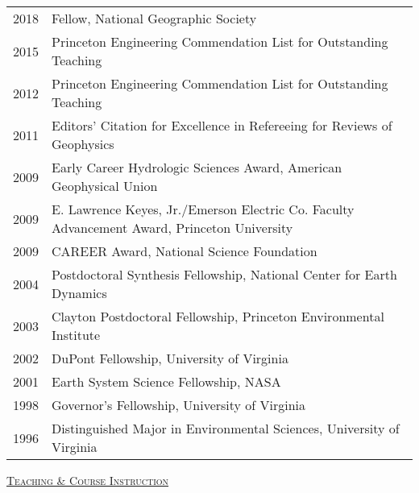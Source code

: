 \documentclass[10pt]{report}
\begin{document}
\begin{tabular}{l l}

2018 & Fellow, National Geographic Society \\
2015 & Princeton Engineering Commendation List for Outstanding Teaching \\
2012 & Princeton Engineering Commendation List for Outstanding Teaching \\ 
2011 & Editors' Citation for Excellence in Refereeing for Reviews of Geophysics \\
2009 & Early Career Hydrologic Sciences Award, American Geophysical Union \\  
2009 & E. Lawrence Keyes, Jr./Emerson Electric Co. Faculty Advancement Award, Princeton University \\
2009 & CAREER Award, National Science Foundation \\
2004 & Postdoctoral Synthesis Fellowship, National Center for Earth Dynamics \\
2003 & Clayton Postdoctoral Fellowship, Princeton Environmental Institute \\
2002 & DuPont Fellowship, University of Virginia \\
2001 & Earth System Science Fellowship, NASA \\
1998 & Governor's Fellowship, University of Virginia \\
1996 & Distinguished Major in Environmental Sciences, University of Virginia \\
\end{tabular}

\vspace{.1in}

\textsc{\underline{Teaching \& Course Instruction}}
\end{document}
